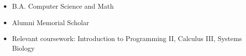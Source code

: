 \documentclass[a4paper]{resume}
\begin{document}
\vspace*{-20pt}



\vspace{20pt}

\begin{itemize} \vspace{-5pt} \itemsep -2pt
	\item B.A. Computer Science and Math
	\item Alumni Memorial Scholar
	\item Relevant coursework: Introduction to Programming II, Calculus III, Systems Biology
\end{itemize}
\enresection
\end{document}

